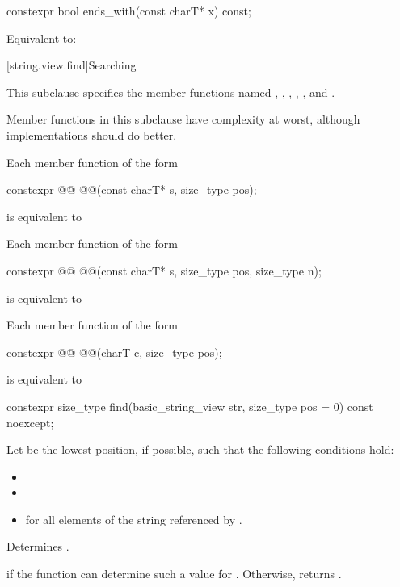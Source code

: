 %
\begin{itemdecl}
constexpr bool ends_with(const charT* x) const;
\end{itemdecl}

\begin{itemdescr}
\pnum
\effects
Equivalent to: 
\end{itemdescr}

[string.view.find]{Searching}

\pnum
This subclause specifies the  member functions named
, , , , , and .

\pnum
Member functions in this subclause have complexity  at worst,
although implementations should do better.

\pnum
Each member function of the form
\begin{codeblock}
constexpr @@ @@(const charT* s, size_type pos);
\end{codeblock}
is equivalent to 

\pnum
Each member function of the form
\begin{codeblock}
constexpr @@ @@(const charT* s, size_type pos, size_type n);
\end{codeblock}
is equivalent to 

\pnum
Each member function of the form
\begin{codeblock}
constexpr @@ @@(charT c, size_type pos);
\end{codeblock}
is equivalent to 

%
\begin{itemdecl}
constexpr size_type find(basic_string_view str, size_type pos = 0) const noexcept;
\end{itemdecl}

\begin{itemdescr}
\pnum
Let  be the lowest position, if possible, such that the following conditions hold:
\begin{itemize}
\item
{}
\item
{}
\item
{} for all elements  of the string referenced by .
\end{itemize}

\pnum
\effects
Determines .

\pnum
\returns
{} if the function can determine such a value for .
Otherwise, returns .
\end{itemdescr}

